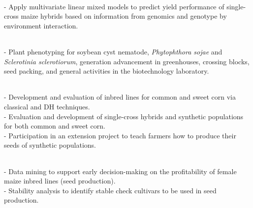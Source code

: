 \documentclass[]{mdkrause_cv_openfont}
\begin{document}
\begin{minipage}[t]{1\textwidth}
\sectionsep
\vspace{0.2 mm}

 \\
- Apply multivariate linear mixed models to predict yield performance of single-cross maize hybrids based on information from genomics and genotype by environment interaction. 

\sectionsep
\vspace{0.2 mm}

 \\
- Plant phenotyping for soybean cyst nematode, \textit{Phytophthora sojae} and \textit{Sclerotinia sclerotiorum}, generation advancement in greenhouses, crossing blocks, seed packing, and general activities in the biotechnology laboratory.

\sectionsep
\vspace{0.2 mm}

 \\
- Development and evaluation of inbred lines for common and sweet corn via classical and DH techniques. \\
- Evaluation and development of single-cross hybrids and synthetic populations for both common and sweet corn. \\
- Participation in an extension project to teach farmers how to produce their seeds of synthetic populations.

\sectionsep
\vspace{0.2 mm}

 \\
- Data mining to support early decision-making on the profitability of female maize inbred lines (seed production). \\
- Stability analysis to identify stable check cultivars to be used in seed production. 

\end{minipage} 
\hfill
\end{document}
